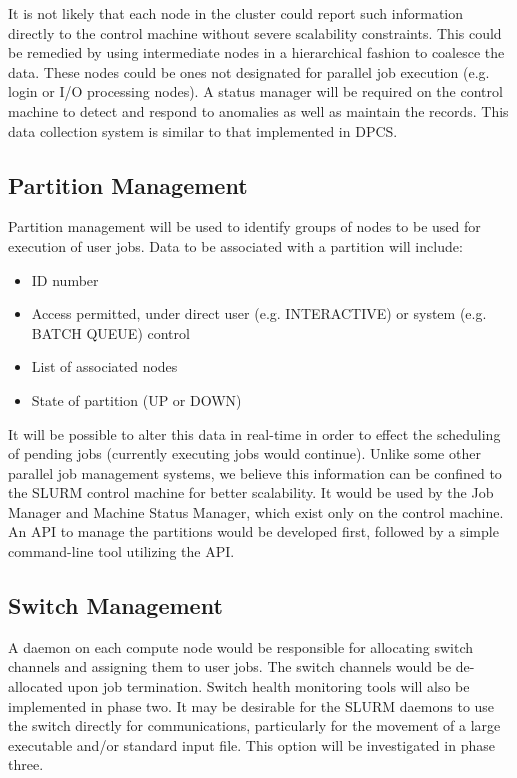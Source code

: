It is not likely that each node in the cluster could report such information
directly to the control machine without severe scalability constraints. This
could be remedied by using intermediate nodes in a hierarchical fashion to
coalesce the data. These nodes could be ones not designated for parallel job
execution (e.g. login or I/O processing nodes). A status manager will be
required on the control machine to detect and respond to anomalies as well as
maintain the records. This data collection system is similar to that
implemented in DPCS. 

\subsection{Partition Management}

Partition management will be used to identify groups of nodes to be used for
execution of user jobs. Data to be associated with a partition will include:
\begin{itemize}
\item ID number
\item Access permitted, under direct user (e.g. INTERACTIVE) or system (e.g. BATCH QUEUE) control
\item List of associated nodes
\item State of partition (UP or DOWN)
\end{itemize}

It will be possible to alter this data in real-time in order to effect the
scheduling of pending jobs (currently executing jobs would continue). Unlike some
other parallel job management systems, we believe this information can be
confined to the SLURM control machine for better scalability. It would be used
by the Job Manager and Machine Status Manager, which exist only on the control
machine. An API to manage the partitions would be developed first, followed by
a simple command-line tool utilizing the API.

\subsection{Switch Management}

A daemon on each compute node would be responsible for allocating switch
channels and assigning them to user jobs. The switch channels would be
de-allocated upon job termination. Switch health monitoring tools will 
also be implemented in phase two. It may be desirable for the SLURM daemons to use the
switch directly for communications, particularly for the movement of a large 
executable and/or standard input file. This option will be investigated in phase
three. 

